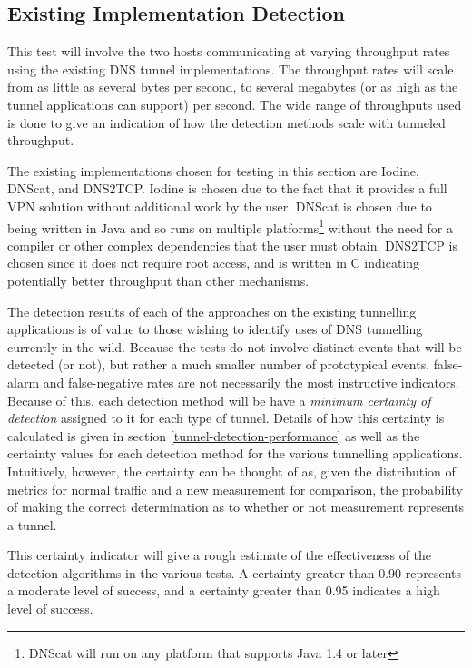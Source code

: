 \documentclass[12pt]{report}
\theoremstyle{remark}
\theoremstyle{definition}
\theoremstyle{definition}
\theoremstyle{definition}
\begin{document}
\subsection{Existing Implementation Detection}
\label{test-existing}
This test will involve the two hosts communicating at varying throughput rates
using the existing DNS tunnel implementations. The throughput rates will scale
from as little as several bytes per second, to several megabytes (or as high as
the tunnel applications can support) per second. The wide range of throughputs
used is done to give an indication of how the detection methods scale with
tunneled throughput.

The existing implementations chosen for testing in this section are
Iodine\cite{iodinesrc}, DNScat\cite{dnscatsrc}, and DNS2TCP\cite{dns2tcpsrc}.
Iodine is chosen due to the fact that it provides a full VPN solution without
additional work by the user. DNScat is chosen due to being written in Java and
so runs on multiple platforms\footnote{DNScat will run on any platform that
supports Java 1.4 or later\cite{dnscatsrc}} without the need for a compiler or
other complex dependencies that the user must obtain. DNS2TCP is chosen since it
does not require root access, and is written in C indicating potentially better
throughput than other mechanisms.

The detection results of each of the approaches on the existing tunnelling
applications is of value to those wishing to identify uses of DNS tunnelling
currently in the wild. Because the tests do not involve distinct events that
will be detected (or not), but rather a much smaller number of prototypical
events, false-alarm and false-negative rates are not necessarily the most
instructive indicators. Because of this, each detection method will be have a
\emph{minimum certainty of detection} assigned to it for each type of tunnel.
Details of how this certainty is calculated is given in section
\ref{tunnel-detection-performance} as well as the certainty values for each
detection method for the various tunnelling applications. Intuitively, however,
the certainty can be thought of as, given the distribution of metrics for normal
traffic and a new measurement for comparison, the probability of making the
correct determination as to whether or not measurement represents a tunnel.

This certainty indicator will give a rough estimate of the effectiveness of the
detection algorithms in the various tests. A certainty greater than 0.90
represents a moderate level of success, and a certainty greater than 0.95
indicates a high level of success.
\end{document}
